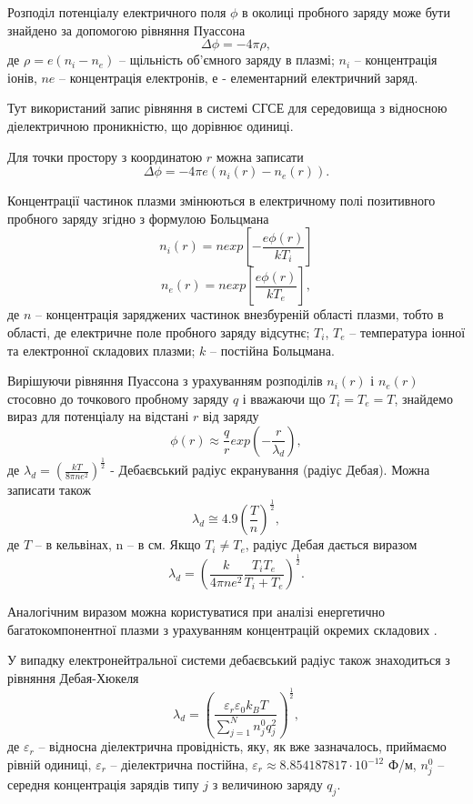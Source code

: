 \documentclass[a4paper,12pt]{article}
\begin{document}
Розподіл потенціалу електричного поля $\phi$ в околиці пробного заряду може бути знайдено за допомогою рівняння Пуассона
\[\Delta \phi = -4 \pi \rho,\]
де $\rho = e(n_i - n_e)$ -- щільність об'ємного заряду в плазмі; $n_i$ -- концентрація іонів, $ne$ -- концентрація електронів, $е$ - елементарний електричний заряд.

Тут використаний запис рівняння в системі СГСЕ для середовища з відносною діелектричною проникністю, що дорівнює одиниці.

Для точки простору з координатою $r$ можна записати
\[\Delta \phi = -4 \pi e (n_i(r) - n_e(r)).\]

Концентрації частинок плазми змінюються в електричному полі позитивного пробного заряду згідно з формулою Больцмана
\[n_i(r) = n exp\left[ - \frac{e\phi(r)}{kT_i} \right]\]
\[n_e(r) = n exp\left[  \frac{e\phi(r)}{kT_e} \right],\]
де $n$ -- концентрація заряджених частинок внезбуреній області плазми, тобто в області, де електричне поле пробного заряду відсутнє; $T_i$, $T_e$ -- температура іонної та електронної складових плазми; $k$ -- постійна Больцмана.

Вирішуючи рівняння Пуассона з урахуванням розподілів $n_i(r)$ і $n_e(r)$ стосовно до точкового пробному заряду $q$ і вважаючи що $T_i = T_e = T$, знайдемо вираз для потенціалу на відстані $r$ від заряду
\[\phi (r) \approx \frac{q}{r}exp \left( - \frac{r}{\lambda_{d}} \right),\]
де $\lambda_{d} = \left( \frac{kT}{8 \pi n e^2} \right)^{\frac{1}{2}}$ - Дебаєвський радіус екранування (радіус Дебая). Можна записати також
\[\lambda_{d} \cong 4.9 \left( \frac{T}{n} \right)^{\frac{1}{2}},\]
де $T$ -- в кельвінах, n -- в см.
Якщо $T_i \neq T_e$, радіус Дебая дається виразом
\[\lambda_{d} = \left( \frac{k}{4 \pi n e^2} \frac{T_i T_e}{T_i + T_e} \right)^{\frac{1}{2}}.\]

Аналогічним виразом можна користуватися при аналізі енергетично багатокомпонентної плазми з урахуванням концентрацій окремих складових \cite{novikov}.

У випадку електронейтральної системи дебаєвський радіус також знаходиться з рівняння Дебая-Хюкеля
\begin{equation} \label{eq:debye_radius}
\lambda_{d} = \left( \frac{\varepsilon_r \varepsilon_0 k_B T}{\sum \limits_{j=1}^{N}{n_j^0 q_j^2}} \right)^{\frac{1}{2}},
\end{equation}
де $\varepsilon_r$ -- відносна діелектрична провідність, яку, як вже зазначалось, приймаємо рівній одиниці, $\varepsilon_r$ -- діелектрична постійна, $\varepsilon_r \approx 8.854187817 \cdot 10^{-12}$ Ф/м, $n_j^0$ -- середня концентрація зарядів типу $j$ з величиною заряду $q_j$.
\end{document}
